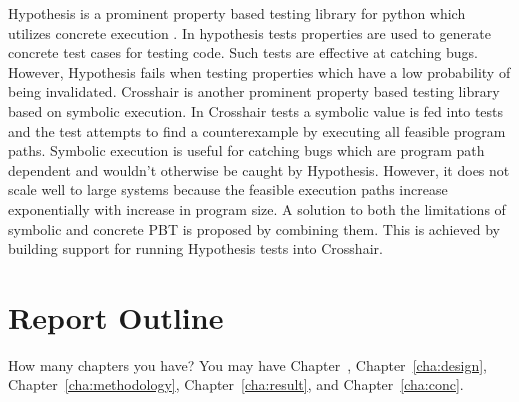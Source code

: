 Hypothesis is a prominent property based testing library for python which utilizes concrete execution . In hypothesis tests properties are used to generate concrete test cases for testing code. Such tests are effective at catching bugs. However, Hypothesis fails when testing properties which have a low probability of being invalidated. Crosshair is another prominent property based testing library based on symbolic execution. In Crosshair tests a symbolic value is fed into tests and the test attempts to find a counterexample by executing all feasible program paths. Symbolic execution is useful for catching bugs which are program path dependent and wouldn’t otherwise be caught by Hypothesis. However, it does not scale well to large systems because the feasible execution paths increase exponentially with increase in program size. A solution to both the limitations of symbolic and concrete PBT is proposed by combining them. This is achieved by building support for running Hypothesis tests into Crosshair.


\section{Report Outline}
\label{sec:outline}

How many chapters you have? You may have Chapter~,
Chapter~\ref{cha:design}, Chapter~\ref{cha:methodology},
Chapter~\ref{cha:result}, and Chapter~\ref{cha:conc}.
